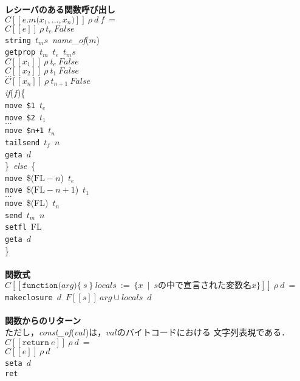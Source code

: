 \documentclass[a4j,12pt]{jarticle}
\begin{document}
{\begin{tabbing}
\textbf{レシーバのある関数呼び出し} \\
\>$C[[e.m\texttt{(}x_1, ... , x_n\texttt{)}]]\ \rho\ d\ f\ =$ \\
\>\>$C[[e]]\ \rho\ t_e\ False$ \\
\>\>\texttt{string}\ $t_ms$\ \textit{name\_of}($m$) \\
\>\>\texttt{getprop}\ $t_m$\ $t_e$\ $t_ms$ \\
\>\>$C[[x_1]]\ \rho\ t_e\ False$ \\
\>\>$C[[x_2]]\ \rho\ t_1\ False$ \\
\>\>$...$ \\
\>\>$C[[x_n]]\ \rho\ t_{n+1}\ False$ \\
\>\>\textit{if}($f$)\{ \\
\>\>\>\texttt{move}\ \texttt{\$1}\ $t_e$ \\
\>\>\>\texttt{move}\ \texttt{\$2}\ $t_1$ \\
\>\>\>$...$ \\
\>\>\>\texttt{move}\ \texttt{\$n+1}\ $t_n$ \\
\>\>\>\texttt{tailsend}\ $t_f$\ $n$ \\
\>\>\>\texttt{geta}\ $d$ \\
\>\>\}\ \textit{else}\ \{ \\
\>\>\>\texttt{move}\ \$($\textrm{FL}-n$)\ $t_e$ \\
\>\>\>\texttt{move}\ \$($\textrm{FL}-n+1$)\ $t_1$ \\
\>\>\>$...$ \\
\>\>\>\texttt{move}\ \$(FL)\ $t_n$ \\
\>\>\>\texttt{send}\ $t_m$\ $n$ \\
\>\>\>\texttt{setfl}\ FL \\
\>\>\>\texttt{geta}\ $d$ \\
\>\>\} \\
\\

\textbf{関数式} \\
\>$C[[\texttt{function(}arg\texttt{)\{}\ s\ \texttt{\}}\ 
  locals\ :=\ \{x\ \mid\ sの中で宣言された変数名x\}]]\ \rho\ d\ =$ \\
\>\>\texttt{makeclosure}\ $d$\ $F[[s]]\ arg\cup locals$\ $d$ \\
\\

\textbf{関数からのリターン} \\
ただし，\textit{const\_of}($val$)は，$val$のバイトコードにおける
文字列表現である．\\
\>$ C[[\texttt{return}\ e]]\ \rho\ d\ =$ \\
\>\>$C[[e]]\ \rho\ d $ \\
\>\>\texttt{seta}\ $d$ \\
\>\>\texttt{ret} \\

\end{tabbing}
}
\end{document}
